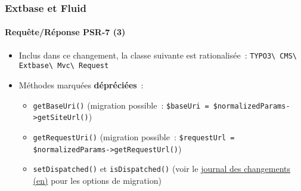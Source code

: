 %

\begin{frame}[fragile]
	\frametitle{Extbase et Fluid}
	\framesubtitle{Requête/Réponse PSR-7 (3)}


	\begin{itemize}
		\item Inclus dans ce changement, la classe suivante est rationalisée~:\newline
			\texttt{TYPO3\textbackslash
				CMS\textbackslash
				Extbase\textbackslash
				Mvc\textbackslash
				Request}
		\item Méthodes marquées \textbf{dépréciées}~:
			\begin{itemize}
				\item \texttt{getBaseUri()}\newline
					\smaller(migration possible~: \texttt{\$baseUri = \$normalizedParams->getSiteUrl()})\small
				\item \texttt{getRequestUri()}\newline
					\smaller(migration possible~: \texttt{\$requestUrl = \$normalizedParams->getRequestUrl()})\small
				\item \texttt{setDispatched()} et \texttt{isDispatched()}\newline
					\smaller(voir le \href{https://docs.typo3.org/c/typo3/cms-core/master/en-us/Changelog/11.3/Deprecation-94394-ExtbaseRequestSetDispatchedAndIsDispatched.html}{journal des changements (en)} pour les options de migration)\small
			\end{itemize}

	\end{itemize}

\end{frame}

